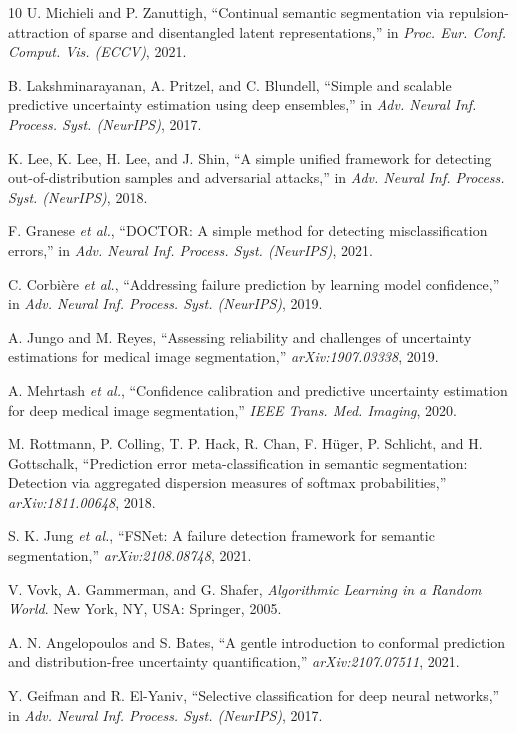 \documentclass[runningheads]{llncs}
\begin{document}
\begin{thebibliography}{10}
 U. Michieli and P. Zanuttigh, ``Continual semantic
segmentation via repulsion-attraction of sparse and disentangled latent
representations,'' in \emph{Proc. Eur. Conf. Comput. Vis. (ECCV)}, 2021.

 B. Lakshminarayanan, A. Pritzel, and C. Blundell,
``Simple and scalable predictive uncertainty estimation using deep
ensembles,'' in \emph{Adv. Neural Inf. Process. Syst. (NeurIPS)}, 2017.

 K. Lee, K. Lee, H. Lee, and J. Shin, ``A simple unified
framework for detecting out-of-distribution samples and adversarial
attacks,'' in \emph{Adv. Neural Inf. Process. Syst. (NeurIPS)}, 2018.

 F. Granese \emph{et al.}, ``DOCTOR: A simple method for detecting misclassification
errors,'' in \emph{Adv. Neural Inf. Process. Syst. (NeurIPS)}, 2021.

 C. Corbi\`ere \emph{et al.}, ``Addressing failure prediction by learning model confidence,''
in \emph{Adv. Neural Inf. Process. Syst. (NeurIPS)}, 2019.

 A. Jungo and M. Reyes, ``Assessing reliability and
challenges of uncertainty estimations for medical image segmentation,''
\emph{arXiv:1907.03338}, 2019.

 A. Mehrtash \emph{et al.}, ``Confidence calibration
and predictive uncertainty estimation for deep medical image segmentation,''
\emph{IEEE Trans. Med. Imaging}, 2020.

 M. Rottmann, P. Colling, T. P. Hack, R. Chan,
F. H\"uger, P. Schlicht, and H. Gottschalk, ``Prediction error
meta-classification in semantic segmentation: Detection via aggregated
dispersion measures of softmax probabilities,'' \emph{arXiv:1811.00648},
2018.

 S. K. Jung \emph{et al.}, ``FSNet: A failure detection
framework for semantic segmentation,'' \emph{arXiv:2108.08748}, 2021.

 V. Vovk, A. Gammerman, and G. Shafer, \emph{Algorithmic
Learning in a Random World}. New York, NY, USA: Springer, 2005.

 A. N. Angelopoulos and S. Bates, ``A gentle
introduction to conformal prediction and distribution-free uncertainty
quantification,'' \emph{arXiv:2107.07511}, 2021.

 Y. Geifman and R. El-Yaniv, ``Selective classification
for deep neural networks,'' in \emph{Adv. Neural Inf. Process. Syst.
(NeurIPS)}, 2017.


\end{thebibliography}
\end{document}
